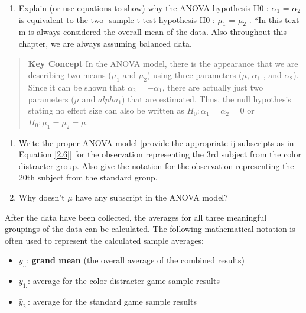 \documentclass[
]{report}
\providecommand{\tightlist}{%
  \setlength{\itemsep}{0pt}\setlength{\parskip}{0pt}}
\begin{document}
\begin{enumerate}
\def\labelenumi{\arabic{enumi}.}
\setcounter{enumi}{15}
\tightlist
\item
  Explain (or use equations to show) why the ANOVA hypothesis H0 : \(\alpha_1\) = \(\alpha_2\) is equivalent to the two- sample t-test hypothesis H0 : \(\mu_1\) = \(\mu_2\) .
  *In this text m is always considered the overall mean of the data. Also throughout this chapter, we are always assuming balanced data.
\end{enumerate}

\begin{quote}
\textbf{Key Concept}
In the ANOVA model, there is the appearance that we are describing two means (\(\mu_1\) and \(\mu_2\)) using three parameters (\(\mu\), \(\alpha_1\) , and \(\alpha_2\)). Since it can be shown that \(\alpha_2 = -\alpha_1\), there are actually just two parameters (\(\mu\) and \(alpha_1\)) that are estimated. Thus, the null hypothesis stating no effect size can also be written as \(H_0: \alpha_1 = \alpha_2 = 0\) or \(H_0: \mu_1 = \mu_2 = \mu\).
\end{quote}

\begin{enumerate}
\def\labelenumi{\arabic{enumi}.}
\setcounter{enumi}{16}
\item
  Write the proper ANOVA model {[}provide the appropriate ij subscripts as in Equation \ref{2.6}{]} for the observation representing the 3rd subject from the color distracter group. Also give the notation for the observation representing the 20th subject from the standard group.
\item
  Why doesn't \(\mu\) have any subscript in the ANOVA model?
\end{enumerate}

After the data have been collected, the averages for all three meaningful groupings of the data can be calculated. The following mathematical notation is often used to represent the calculated sample averages:

\begin{itemize}
\tightlist
\item
  \(\bar{y}_{..}\): \textbf{grand mean} (the overall average of the combined results)
\item
  \(\bar{y}_{1.}\): average for the color distracter game sample results
\item
  \(\bar{y}_{2.}\): average for the standard game sample results
\end{itemize}
\end{document}
